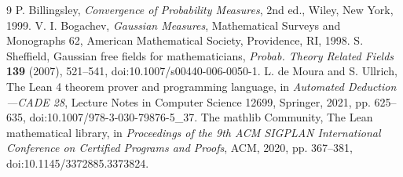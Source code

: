 \documentclass[11pt]{amsart}
\theoremstyle{remark}\newtheorem{remark}[theorem]{Remark}
\begin{document}
\begin{thebibliography}{9}
 P. Billingsley, \emph{Convergence of Probability Measures}, 2nd ed., Wiley, New York, 1999.
 V. I. Bogachev, \emph{Gaussian Measures}, Mathematical Surveys and Monographs 62, American Mathematical Society, Providence, RI, 1998.
 S. Sheffield, Gaussian free fields for mathematicians, \emph{Probab. Theory Related Fields} \textbf{139} (2007), 521--541, doi:10.1007/s00440-006-0050-1.
 L. de Moura and S. Ullrich, The Lean 4 theorem prover and programming language, in \emph{Automated Deduction---CADE 28}, Lecture Notes in Computer Science 12699, Springer, 2021, pp. 625--635, doi:10.1007/978-3-030-79876-5\_37.
 The mathlib Community, The Lean mathematical library, in \emph{Proceedings of the 9th ACM SIGPLAN International Conference on Certified Programs and Proofs}, ACM, 2020, pp. 367--381, doi:10.1145/3372885.3373824.
\end{thebibliography}
\end{document}
